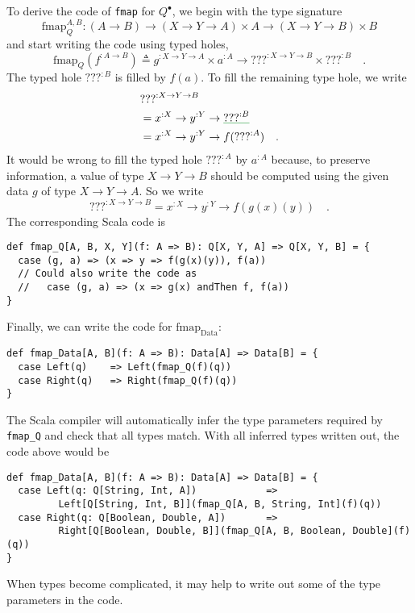To derive the code of \lstinline!fmap! for $Q^{\bullet}$, we begin
with the type signature
\[
\text{fmap}_{Q}^{A,B}:\left(A\rightarrow B\right)\rightarrow\left(X\rightarrow Y\rightarrow A\right)\times A\rightarrow\left(X\rightarrow Y\rightarrow B\right)\times B
\]
and start writing the code using typed holes,
\[
\text{fmap}_{Q}(f^{:A\rightarrow B})\triangleq g^{:X\rightarrow Y\rightarrow A}\times a^{:A}\rightarrow\text{???}^{:X\rightarrow Y\rightarrow B}\times\text{???}^{:B}\quad.
\]
The typed hole $\text{???}^{:B}$ is filled by $f(a)$. To fill the
remaining type hole, we write
\begin{align*}
 & \text{???}^{:X\rightarrow Y\rightarrow B}\\
 & =x^{:X}\rightarrow y^{:Y}\rightarrow\gunderline{\text{???}^{:B}}\\
 & =x^{:X}\rightarrow y^{:Y}\rightarrow f(\text{???}^{:A})\quad.
\end{align*}
It would be wrong to fill the typed hole $\text{???}^{:A}$ by $a^{:A}$
because, to preserve information, a value of type $X\rightarrow Y\rightarrow B$
should be computed using the given data $g$ of type $X\rightarrow Y\rightarrow A$.
So we write
\[
\text{???}^{:X\rightarrow Y\rightarrow B}=x^{:X}\rightarrow y^{:Y}\rightarrow f(g(x)(y))\quad.
\]
The corresponding Scala code is
\begin{lstlisting}
def fmap_Q[A, B, X, Y](f: A => B): Q[X, Y, A] => Q[X, Y, B] = {
  case (g, a) => (x => y => f(g(x)(y)), f(a))
  // Could also write the code as
  //   case (g, a) => (x => g(x) andThen f, f(a))
}
\end{lstlisting}
Finally, we can write the code for $\text{fmap}_{\text{Data}}$:
\begin{lstlisting}
def fmap_Data[A, B](f: A => B): Data[A] => Data[B] = {
  case Left(q)    => Left(fmap_Q(f)(q))
  case Right(q)   => Right(fmap_Q(f)(q))
}
\end{lstlisting}
The Scala compiler will automatically infer the type parameters required
by \lstinline!fmap_Q! and check that all types match. With all inferred
types written out, the code above would be
\begin{lstlisting}
def fmap_Data[A, B](f: A => B): Data[A] => Data[B] = {
  case Left(q: Q[String, Int, A])            =>
         Left[Q[String, Int, B]](fmap_Q[A, B, String, Int](f)(q))
  case Right(q: Q[Boolean, Double, A])       =>
         Right[Q[Boolean, Double, B]](fmap_Q[A, B, Boolean, Double](f)(q))
}
\end{lstlisting}
When types become complicated, it may help to write out some of the
type parameters in the code.

